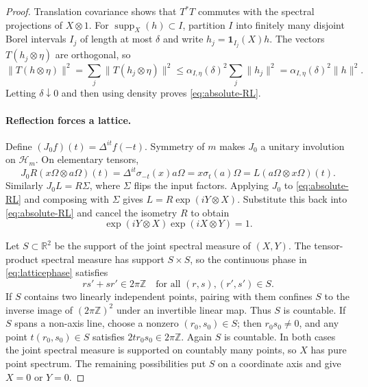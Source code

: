 \documentclass[11pt]{article}
\theoremstyle{definition}
\DeclareMathOperator{\supp}{supp}
\newcommand{\R}{\mathbb R}
\newcommand{\one}{\mathbf1}
\begin{document}
\begin{proof}
Translation covariance shows that $T^*T$ commutes with the spectral
projections of $X\otimes1$. For $\supp_X(h)\subset I$, partition $I$ into
finitely many disjoint Borel intervals $I_j$ of length at most $\delta$ and
write $h_j=\one_{I_j}(X)h$. The vectors $T(h_j\otimes\eta)$ are orthogonal,
so
\[
 \|T(h\otimes\eta)\|^2
 =\sum_j\|T(h_j\otimes\eta)\|^2
 \le\alpha_{I,\eta}(\delta)^2\sum_j\|h_j\|^2
 =\alpha_{I,\eta}(\delta)^2\|h\|^2.
\]
Letting $\delta\downarrow0$ and then using density proves
\eqref{eq:absolute-RL}.

\paragraph{Reflection forces a lattice.}
Define $(J_0f)(t)=\Delta^{it}f(-t)$. Symmetry of $m$ makes $J_0$ a unitary
involution on $\mathcal H_m$. On elementary tensors,
\[
 J_0R(x\Omega\otimes a\Omega)(t)
 =\Delta^{it}\sigma_{-t}(x)a\Omega
 =x\sigma_t(a)\Omega
 =L(a\Omega\otimes x\Omega)(t).
\]
Similarly $J_0L=R\Sigma$, where $\Sigma$ flips the input factors. Applying
$J_0$ to \eqref{eq:absolute-RL} and composing with $\Sigma$ gives
$L=R\exp(iY\otimes X)$. Substitute this back into \eqref{eq:absolute-RL}
and cancel the isometry $R$ to obtain
\begin{equation}\label{eq:latticephase}
 \exp(iY\otimes X)\exp(iX\otimes Y)=1.
\end{equation}

Let $S\subset\R^2$ be the support of the joint spectral measure of $(X,Y)$.
The tensor-product spectral measure has support $S\times S$, so the
continuous phase in \eqref{eq:latticephase} satisfies
\begin{equation}\label{eq:lattice}
 rs'+sr'\in2\pi\mathbb Z
 \quad\text{for all }(r,s),(r',s')\in S.
\end{equation}
If $S$ contains two linearly independent points, pairing with them confines
$S$ to the inverse image of $(2\pi\mathbb Z)^2$ under an invertible linear
map. Thus $S$ is countable. If $S$ spans a non-axis line, choose a nonzero
$(r_0,s_0)\in S$; then $r_0s_0\ne0$, and any point $t(r_0,s_0)\in S$
satisfies $2tr_0s_0\in2\pi\mathbb Z$. Again $S$ is countable. In both cases
the joint spectral measure is supported on countably many points, so $X$
has pure point spectrum. The remaining possibilities put $S$ on a
coordinate axis and give $X=0$ or $Y=0$.


\end{proof}
\end{document}
